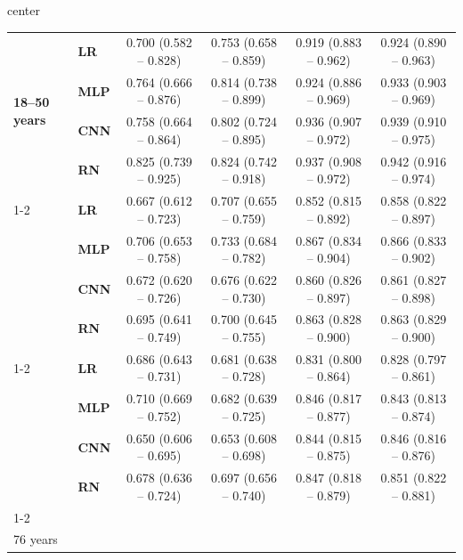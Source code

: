 \documentclass[preprint]{elsarticle}
\begin{document}
\begin{table}[H]
\begin{adjustbox}{center}
\begin{tabular}{@{}llcccc@{}}
\multirow{4}{*}{\begin{minipage}{0.65in}\textbf{18--50 years}\end{minipage}} %
& \textbf{LR} & 0.700 (0.582 -- 0.828) & 0.753 (0.658 -- 0.859) & 0.919 (0.883 -- 0.962) & 0.924 (0.890 -- 0.963) \\
& \textbf{MLP} & 0.764 (0.666 -- 0.876) & 0.814 (0.738 -- 0.899) & 0.924 (0.886 -- 0.969) & 0.933 (0.903 -- 0.969) \\
& \textbf{CNN} & 0.758 (0.664 -- 0.864) & 0.802 (0.724 -- 0.895) & 0.936 (0.907 -- 0.972) & 0.939 (0.910 -- 0.975) \\
& \textbf{RN} & 0.825 (0.739 -- 0.925) & 0.824 (0.742 -- 0.918) & 0.937 (0.908 -- 0.972) & 0.942 (0.916 -- 0.974) \\
  \cmidrule(lr){1-2}
\multirow{4}{*}{\begin{minipage}{0.65in}\textbf{51--64 years}\end{minipage}} %
& \textbf{LR} & 0.667 (0.612 -- 0.723) & 0.707 (0.655 -- 0.759) & 0.852 (0.815 -- 0.892) & 0.858 (0.822 -- 0.897) \\
& \textbf{MLP} & 0.706 (0.653 -- 0.758) & 0.733 (0.684 -- 0.782) & 0.867 (0.834 -- 0.904) & 0.866 (0.833 -- 0.902) \\
& \textbf{CNN} & 0.672 (0.620 -- 0.726) & 0.676 (0.622 -- 0.730) & 0.860 (0.826 -- 0.897) & 0.861 (0.827 -- 0.898) \\
& \textbf{RN} & 0.695 (0.641 -- 0.749) & 0.700 (0.645 -- 0.755) & 0.863 (0.828 -- 0.900) & 0.863 (0.829 -- 0.900) \\
  \cmidrule(lr){1-2}  
\multirow{4}{*}{\begin{minipage}{0.65in}\textbf{65--75 years}\end{minipage}} %
& \textbf{LR} & 0.686 (0.643 -- 0.731) & 0.681 (0.638 -- 0.728) & 0.831 (0.800 -- 0.864) & 0.828 (0.797 -- 0.861) \\
& \textbf{MLP} & 0.710 (0.669 -- 0.752) & 0.682 (0.639 -- 0.725) & 0.846 (0.817 -- 0.877) & 0.843 (0.813 -- 0.874) \\
& \textbf{CNN} & 0.650 (0.606 -- 0.695) & 0.653 (0.608 -- 0.698) & 0.844 (0.815 -- 0.875) & 0.846 (0.816 -- 0.876) \\
& \textbf{RN} & 0.678 (0.636 -- 0.724) & 0.697 (0.656 -- 0.740) & 0.847 (0.818 -- 0.879) & 0.851 (0.822 -- 0.881) \\
  \cmidrule(lr){1-2}
\multirow{4}{*}{\begin{minipage}{0.65in}\textbf{Over \\76 years}\end{minipage}} %

\end{tabular}
\end{adjustbox}
\end{table}
\end{document}
